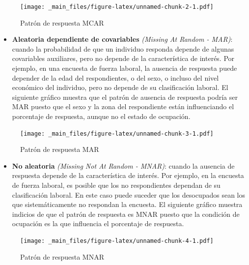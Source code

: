 \documentclass[
  12pt,
  spanish,
]{book}
\providecommand{\tightlist}{%
  \setlength{\itemsep}{0pt}\setlength{\parskip}{0pt}}
\begin{document}
\begin{figure}
\centering
\texttt{[image: \_main\_files/figure-latex/unnamed-chunk-2-1.pdf]}
\caption{\label{fig:unnamed-chunk-2}Patrón de respuesta MCAR}
\end{figure}

\begin{itemize}
\tightlist
\item
  \textbf{Aleatoria dependiente de covariables} \emph{(Missing At Random - MAR)}: cuando la probabilidad de que un individuo responda depende de algunas covariables auxiliares, pero no depende de la característica de interés. Por ejemplo, en una encuesta de fuerza laboral, la ausencia de respuesta puede depender de la edad del respondientes, o del sexo, o incluso del nivel económico del individuo, pero no depende de su clasificación laboral. El siguiente gráfico muestra que el patrón de ausencia de respuesta podría ser MAR puesto que el sexo y la zona del respondiente están influenciando el porcentaje de respuesta, aunque no el estado de ocupación.
\end{itemize}

\begin{figure}
\centering
\texttt{[image: \_main\_files/figure-latex/unnamed-chunk-3-1.pdf]}
\caption{\label{fig:unnamed-chunk-3}Patrón de respuesta MAR}
\end{figure}

\begin{itemize}
\tightlist
\item
  \textbf{No aleatoria} \emph{(Missing Not At Random - MNAR)}: cuando la ausencia de respuesta depende de la característica de interés. Por ejemplo, en la encuesta de fuerza laboral, es posible que los no respondientes dependan de su clasificación laboral. En este caso puede suceder que los desocupados sean los que sistemáticamente no respondan la encuesta. El siguiente gráfico muestra indicios de que el patrón de respuesta es MNAR puesto que la condición de ocupación es la que influencia el porcentaje de respuesta.
\end{itemize}

\begin{figure}
\centering
\texttt{[image: \_main\_files/figure-latex/unnamed-chunk-4-1.pdf]}
\caption{\label{fig:unnamed-chunk-4}Patrón de respuesta MNAR}
\end{figure}
\end{document}
